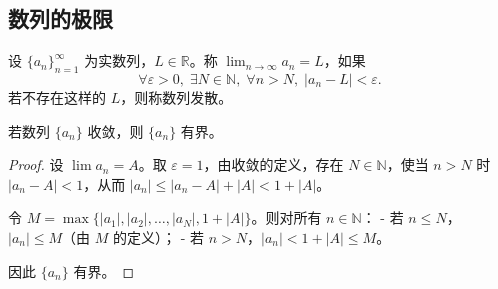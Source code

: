 \subsection{\texorpdfstring{数列的极限}{数列的极限}}

\begin{definition}[数列极限]\label{def:seq_limit}
设 $\{a_n\}_{n=1}^{\infty}$ 为实数列，$L \in \mathbb{R}$。称 $\displaystyle\lim_{n\to\infty} a_n = L$，如果
\[\forall \varepsilon > 0,\; \exists N \in \mathbb{N},\; \forall n > N,\; |a_n - L| < \varepsilon.\]
若不存在这样的 $L$，则称数列发散。
\end{definition}

\begin{proposition}[收敛数列的有界性]\label{prop:convergent_bounded}
若数列 $\{a_n\}$ 收敛，则 $\{a_n\}$ 有界。
\end{proposition}

\begin{proof}
设 $\lim a_n = A$。取 $\varepsilon = 1$，由收敛的定义，存在 $N \in \mathbb{N}$，使当 $n > N$ 时 $|a_n - A| < 1$，从而 $|a_n| \le |a_n - A| + |A| < 1 + |A|$。

令 $M = \max\{|a_1|, |a_2|, \dots, |a_N|, 1 + |A|\}$。则对所有 $n \in \mathbb{N}$：
- 若 $n \le N$，$|a_n| \le M$（由 $M$ 的定义）；
- 若 $n > N$，$|a_n| < 1 + |A| \le M$。

因此 $\{a_n\}$ 有界。
\end{proof}

